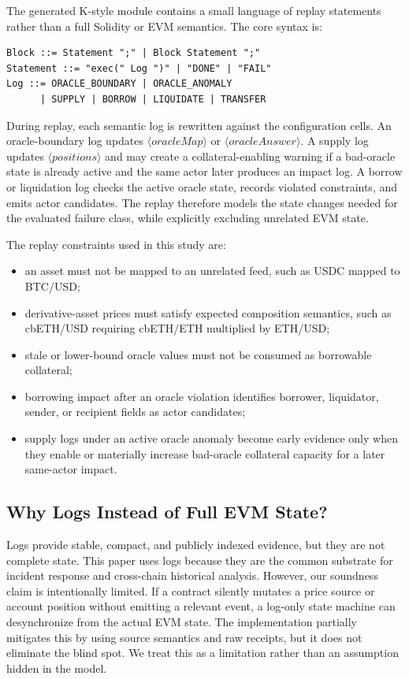 \documentclass[final,5p]{elsarticle}
\begin{document}
The generated K-style module contains a small language of replay statements rather than a full Solidity or EVM semantics.
The core syntax is:

\begin{lstlisting}[basicstyle=\footnotesize\ttfamily,breaklines=true]
Block ::= Statement ";" | Block Statement ";"
Statement ::= "exec(" Log ")" | "DONE" | "FAIL"
Log ::= ORACLE_BOUNDARY | ORACLE_ANOMALY
      | SUPPLY | BORROW | LIQUIDATE | TRANSFER
\end{lstlisting}

During replay, each semantic log is rewritten against the configuration cells.
An oracle-boundary log updates \(\langle oracleMap \rangle\) or \(\langle oracleAnswer \rangle\).
A supply log updates \(\langle positions \rangle\) and may create a collateral-enabling warning if a bad-oracle state is already active and the same actor later produces an impact log.
A borrow or liquidation log checks the active oracle state, records violated constraints, and emits actor candidates.
The replay therefore models the state changes needed for the evaluated failure class, while explicitly excluding unrelated EVM state.

The replay constraints used in this study are:
\begin{itemize}
    \item an asset must not be mapped to an unrelated feed, such as USDC mapped to BTC/USD;
    \item derivative-asset prices must satisfy expected composition semantics, such as cbETH/USD requiring cbETH/ETH multiplied by ETH/USD;
    \item stale or lower-bound oracle values must not be consumed as borrowable collateral;
    \item borrowing impact after an oracle violation identifies borrower, liquidator, sender, or recipient fields as actor candidates;
    \item supply logs under an active oracle anomaly become early evidence only when they enable or materially increase bad-oracle collateral capacity for a later same-actor impact.
\end{itemize}

\subsection{Why Logs Instead of Full EVM State?}

Logs provide stable, compact, and publicly indexed evidence, but they are not complete state.
This paper uses logs because they are the common substrate for incident response and cross-chain historical analysis.
However, our soundness claim is intentionally limited.
If a contract silently mutates a price source or account position without emitting a relevant event, a log-only state machine can desynchronize from the actual EVM state.
The implementation partially mitigates this by using source semantics and raw receipts, but it does not eliminate the blind spot.
We treat this as a limitation rather than an assumption hidden in the model.
\end{document}

